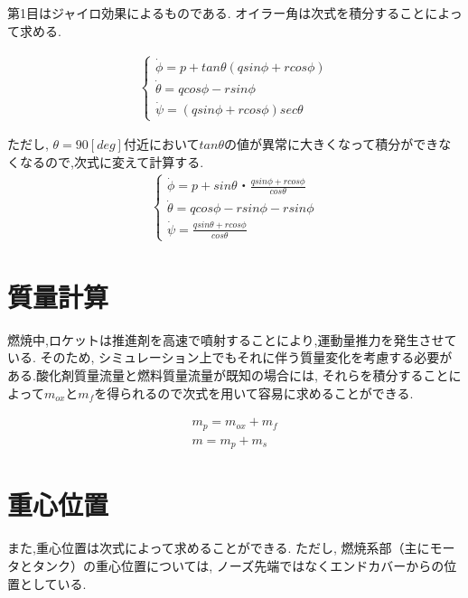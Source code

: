 \documentclass[a4paper]{jarticle}
\begin{document}
第1目はジャイロ効果によるものである.
オイラー角は次式を積分することによって求める.

\begin{eqnarray}
  \begin{cases} 
    \dot \phi = p + tan \theta (q sin \phi + r cos \phi) \\
    \dot \theta = q cos \phi - r sin \phi \\
    \dot \psi = (q sin \phi + r cos \phi)sec \theta
  \end{cases}
\end{eqnarray}

ただし, \( \theta = 90[deg]\)付近において\(tan \theta \)の値が異常に大きくなって積分ができなくなるので,次式に変えて計算する.
\begin{eqnarray}
  \begin{cases}
    \dot \phi = p + sin \theta ・ \frac{q sin \phi +r cos \phi}{cos \theta} \\
    \dot \theta = q cos \phi - r sin \phi - r sin \phi \\
    \dot \psi = \frac{q sin \theta + r cos \phi}{cos \theta}
  \end{cases}
\end{eqnarray}
\section{質量計算}

燃焼中,ロケットは推進剤を高速で噴射することにより,運動量推力を発生させている.
そのため, シミュレーション上でもそれに伴う質量変化を考慮する必要がある.酸化剤質量流量と燃料質量流量が既知の場合には,
それらを積分することによって\(m_{ox}\)と\(m_f\)を得られるので次式を用いて容易に求めることができる.

\begin{eqnarray}
  m_p = m_{ox} + m_f \\
  m = m_p + m_s
\end{eqnarray}


\section{重心位置}

また,重心位置は次式によって求めることができる. ただし, 燃焼系部（主にモータとタンク）の重心位置については, ノーズ先端ではなくエンドカバーからの位置としている.
\end{document}
